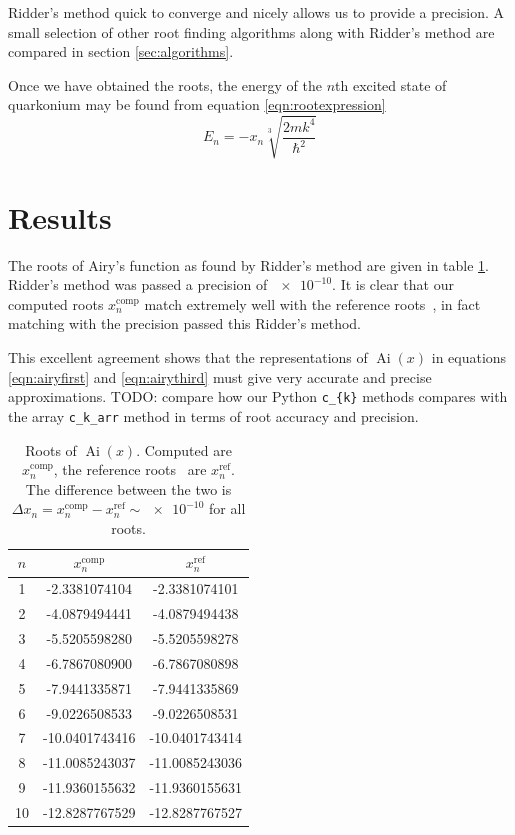 \documentclass[]{article}
\newcommand{\Ai}[1]{\ensuremath{\operatorname{Ai}({#1})}}
\begin{document}
Ridder's method quick to converge and nicely allows us to provide a precision. A small selection of other root finding algorithms along with Ridder's method are compared in section \ref{sec:algorithms}.

Once we have obtained the roots, the energy of the $n$th excited state of quarkonium may be found from equation \ref{eqn:rootexpression}
\begin{equation}
E_{n} = -x_{n} \sqrt[3]{\frac{2mk^{4}}{\hbar^{2}}}
\end{equation}

\section{Results}\label{sec:results}

The roots of Airy's function as found by Ridder's method are given in table \ref{tab:roots}.   Ridder's method was passed a precision of $\num{e-10}$. It is clear that our computed roots $x_{n}^{\mathrm{comp}}$ match extremely well with the reference roots~\cite{ref:abramowitz}, in fact matching with the precision passed this Ridder's method.

This excellent agreement shows that the representations of \Ai{x} in equations \ref{eqn:airyfirst} and \ref{eqn:airythird} must give very accurate and precise approximations. TODO: compare how our Python \verb+c_{k}+ methods compares with the array \verb+c_k_arr+ method in terms of root accuracy and precision.

\begin{table}
	\begin{tabular}{ c c c }
		$n$ & $x_{n}^{\mathrm{comp}}$ & $x_{n}^{\mathrm{ref}}$\\
		\hline
		1  & -2.3381074104 & -2.3381074101\\
		2  & -4.0879494441 & -4.0879494438\\
		3  & -5.5205598280 & -5.5205598278\\
		4  & -6.7867080900 & -6.7867080898\\
		5  & -7.9441335871 & -7.9441335869\\
		6  & -9.0226508533 & -9.0226508531\\
		7  & -10.0401743416 & -10.0401743414\\
		8  & -11.0085243037 & -11.0085243036\\
		9  & -11.9360155632 & -11.9360155631\\
		10 & -12.8287767529 & -12.8287767527
	\end{tabular}
	\caption{Roots of \Ai{x}. Computed are $x_{n}^{\mathrm{comp}}$, the reference roots~\cite{ref:abramowitz} are $x_{n}^{\mathrm{ref}}$. The difference between the two is $\Delta x_{n} = x_{n}^{\mathrm{comp}} - x_{n}^{\mathrm{ref}} \sim \num{e-10}$ for all roots.}
	\label{tab:roots}
\end{table}
\end{document}
